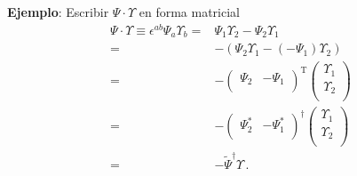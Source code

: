 \begin{frame}
\textbf{Ejemplo}: Escribir $\Psi\cdot \Upsilon$ en forma matricial
\begin{align}
  \label{eq:2to2}
\Psi\cdot \Upsilon\equiv \epsilon^{ab}{\Psi}_a \Upsilon_b=&{\Psi}_1 \Upsilon_2-{\Psi}_2 \Upsilon_1 \nonumber\\
                     =&-\left(\Psi_2 \Upsilon_1 - (-\Psi_1) \Upsilon_2\right) \nonumber\\
                     =&-\begin{pmatrix}
                        \Psi_2 & -\Psi_1\\ 
                        \end{pmatrix}^{\operatorname{T}}
                         \begin{pmatrix}
                           \Upsilon_1\\
                           \Upsilon_2\\
                         \end{pmatrix} \nonumber\\
                     =&-\begin{pmatrix}
                        \Psi_2^* & -\Psi_1^*\\ 
                        \end{pmatrix}^{\dagger}
                         \begin{pmatrix}
                           \Upsilon_1\\
                           \Upsilon_2\\
                         \end{pmatrix} \nonumber\\
                     =&-\widetilde{\Psi}^\dagger \Upsilon\,.
\end{align}


\end{frame}
